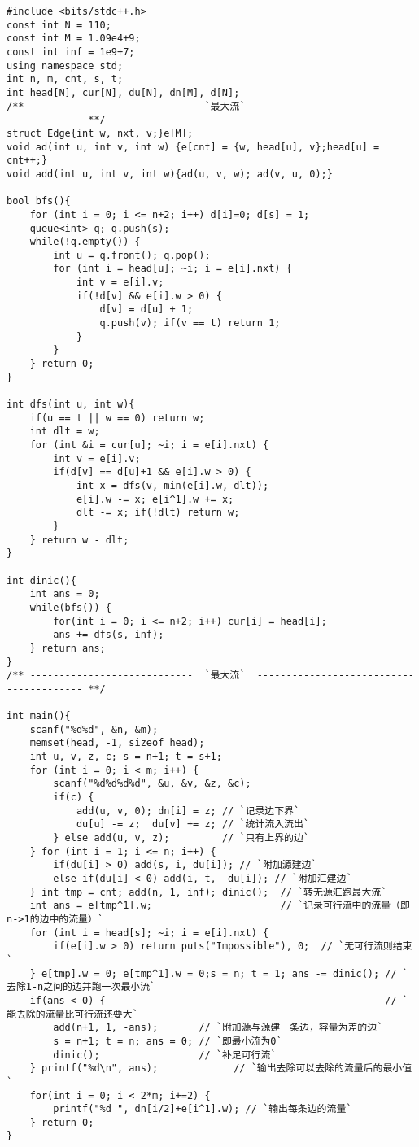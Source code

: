 \begin{lstlisting}
#include <bits/stdc++.h>
const int N = 110;
const int M = 1.09e4+9;
const int inf = 1e9+7;
using namespace std;
int n, m, cnt, s, t;
int head[N], cur[N], du[N], dn[M], d[N];
/** ----------------------------  `最大流`  ---------------------------------------- **/
struct Edge{int w, nxt, v;}e[M];
void ad(int u, int v, int w) {e[cnt] = {w, head[u], v};head[u] = cnt++;}
void add(int u, int v, int w){ad(u, v, w); ad(v, u, 0);}

bool bfs(){
    for (int i = 0; i <= n+2; i++) d[i]=0; d[s] = 1;
    queue<int> q; q.push(s);
    while(!q.empty()) {
        int u = q.front(); q.pop();
        for (int i = head[u]; ~i; i = e[i].nxt) {
            int v = e[i].v;
            if(!d[v] && e[i].w > 0) {
                d[v] = d[u] + 1;
                q.push(v); if(v == t) return 1;
            }
        }
    } return 0;
}

int dfs(int u, int w){
    if(u == t || w == 0) return w;
    int dlt = w;
    for (int &i = cur[u]; ~i; i = e[i].nxt) {
        int v = e[i].v;
        if(d[v] == d[u]+1 && e[i].w > 0) {
            int x = dfs(v, min(e[i].w, dlt));
            e[i].w -= x; e[i^1].w += x;
            dlt -= x; if(!dlt) return w;
        }
    } return w - dlt;
}

int dinic(){
    int ans = 0;
    while(bfs()) {
        for(int i = 0; i <= n+2; i++) cur[i] = head[i];
        ans += dfs(s, inf);
    } return ans;
}
/** ----------------------------  `最大流`  ---------------------------------------- **/

int main(){
    scanf("%d%d", &n, &m);
    memset(head, -1, sizeof head);
    int u, v, z, c; s = n+1; t = s+1;
    for (int i = 0; i < m; i++) {
        scanf("%d%d%d%d", &u, &v, &z, &c);
        if(c) {
            add(u, v, 0); dn[i] = z; // `记录边下界`
            du[u] -= z;  du[v] += z; // `统计流入流出`
        } else add(u, v, z);         // `只有上界的边`
    } for (int i = 1; i <= n; i++) {
        if(du[i] > 0) add(s, i, du[i]); // `附加源建边`
        else if(du[i] < 0) add(i, t, -du[i]); // `附加汇建边`
    } int tmp = cnt; add(n, 1, inf); dinic();  // `转无源汇跑最大流`
    int ans = e[tmp^1].w;                      // `记录可行流中的流量（即n->1的边中的流量）`
    for (int i = head[s]; ~i; i = e[i].nxt) { 
        if(e[i].w > 0) return puts("Impossible"), 0;  // `无可行流则结束`
    } e[tmp].w = 0; e[tmp^1].w = 0;s = n; t = 1; ans -= dinic(); // `去除1-n之间的边并跑一次最小流`
    if(ans < 0) {                                                // `能去除的流量比可行流还要大`
        add(n+1, 1, -ans);       // `附加源与源建一条边，容量为差的边`
        s = n+1; t = n; ans = 0; // `即最小流为0`
        dinic();                 // `补足可行流`
    } printf("%d\n", ans);             // `输出去除可以去除的流量后的最小值`
    for(int i = 0; i < 2*m; i+=2) {
        printf("%d ", dn[i/2]+e[i^1].w); // `输出每条边的流量`
    } return 0;
}
\end{lstlisting}



